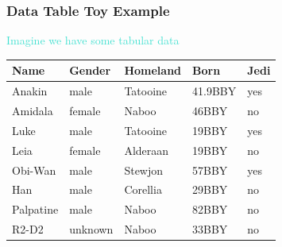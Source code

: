 \documentclass{beamer}\usepackage[]{graphicx}\usepackage[]{color}
\begin{document}
\begin{frame}[fragile]
\frametitle{Data Table Toy Example}

\begin{center}
\textcolor{turquoise}{Imagine we have some tabular data}
\end{center}

\begin{center}
 \begin{tabular}{l l l l l}
  \hline
  Name & Gender & Homeland & Born & Jedi \\
  \hline
  Anakin & male & Tatooine & 41.9BBY & yes \\  
  Amidala & female & Naboo & 46BBY & no \\
  Luke & male & Tatooine & 19BBY & yes \\
  Leia & female & Alderaan & 19BBY & no \\
  Obi-Wan & male & Stewjon & 57BBY & yes \\
  Han & male & Corellia & 29BBY & no \\
  Palpatine & male & Naboo & 82BBY & no \\
  R2-D2 & unknown & Naboo & 33BBY & no \\
  \hline
 \end{tabular}
\end{center}

\end{frame}

\end{document}
